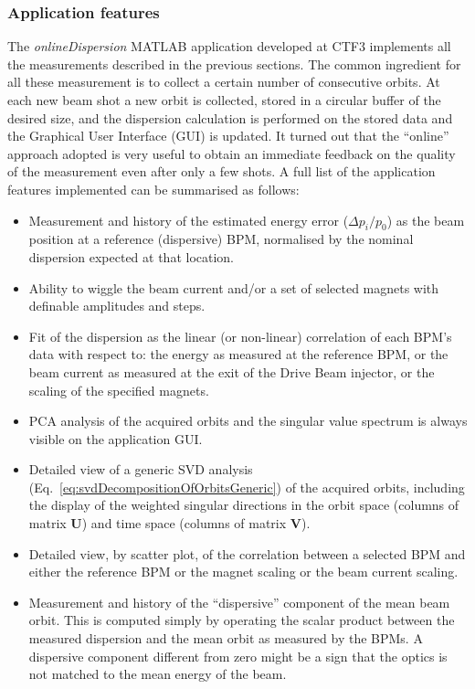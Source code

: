 \subsubsection{Application features}
%
The \emph{onlineDispersion} MATLAB application developed at CTF3 implements all the
measurements described in the previous sections. %
The common ingredient for all these measurement is to collect a certain number of
consecutive orbits.
At each new beam shot a new orbit is collected, stored in a circular buffer of the desired
size, and the dispersion calculation is performed on the stored data and the Graphical
User Interface (GUI) is updated.
It turned out that the ``online'' approach adopted is very useful to obtain an immediate
feedback on the quality of the measurement even after only a few shots.
%
A full list of the application features implemented can be summarised as follows:
%
\begin{itemize}
\item
Measurement and history of the estimated energy error ($\Delta p_i/p_0$) as the beam
position at a reference (dispersive) BPM, normalised by the nominal dispersion expected at
that location.
\item
Ability to wiggle the beam current and/or a set of selected magnets with definable
amplitudes and steps.
\item
Fit of the dispersion as the linear (or non-linear) correlation of each BPM's data with
respect to: 
the energy as measured at the reference BPM,
or the beam current as measured at the exit of the Drive Beam injector,
or the scaling of the specified magnets.
\item
PCA analysis of the acquired orbits and the singular value spectrum is always visible on
the application GUI.
\item
Detailed view of a generic SVD analysis (Eq.~\ref{eq:svdDecompositionOfOrbitsGeneric}) of
the acquired orbits, including the display of the weighted singular directions in the
orbit space (columns of matrix $\mathbf{U}$) and time space (columns of matrix
$\mathbf{V}$).
\item
Detailed view, by scatter plot, of the correlation between a selected BPM and either the
reference BPM or the magnet scaling or the beam current scaling.
\item
Measurement and history of the ``dispersive'' component of the mean beam orbit.
This is computed simply by operating the scalar product between the measured dispersion
and the mean orbit as measured by the BPMs.
A dispersive component different from zero might be a sign that the optics is not matched
to the mean energy of the beam.
\end{itemize}
